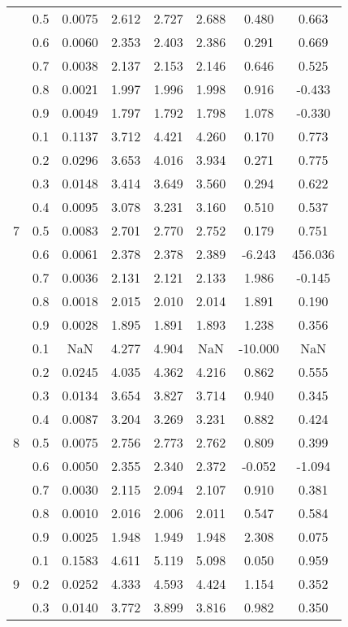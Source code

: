 \documentclass[11pt,a4paper]{report}
\begin{document}
\begin{longtable}{ | c | c || c | c | c | c | c | c | }
 & 0.5 & 0.0075 & 2.612 & 2.727 & 2.688 & 0.480 & 0.663 \\
 & 0.6 & 0.0060 & 2.353 & 2.403 & 2.386 & 0.291 & 0.669 \\
 & 0.7 & 0.0038 & 2.137 & 2.153 & 2.146 & 0.646 & 0.525 \\
 & 0.8 & 0.0021 & 1.997 & 1.996 & 1.998 & 0.916 & -0.433 \\
 & 0.9 & 0.0049 & 1.797 & 1.792 & 1.798 & 1.078 & -0.330 \\
 \hline
\multirow{9}{*}{7} & 0.1 & 0.1137 & 3.712 & 4.421 & 4.260 & 0.170 & 0.773 \\
 & 0.2 & 0.0296 & 3.653 & 4.016 & 3.934 & 0.271 & 0.775 \\
 & 0.3 & 0.0148 & 3.414 & 3.649 & 3.560 & 0.294 & 0.622 \\
 & 0.4 & 0.0095 & 3.078 & 3.231 & 3.160 & 0.510 & 0.537 \\
 & 0.5 & 0.0083 & 2.701 & 2.770 & 2.752 & 0.179 & 0.751 \\
 & 0.6 & 0.0061 & 2.378 & 2.378 & 2.389 & -6.243 & 456.036 \\
 & 0.7 & 0.0036 & 2.131 & 2.121 & 2.133 & 1.986 & -0.145 \\
 & 0.8 & 0.0018 & 2.015 & 2.010 & 2.014 & 1.891 & 0.190 \\
 & 0.9 & 0.0028 & 1.895 & 1.891 & 1.893 & 1.238 & 0.356 \\
 \hline
\multirow{9}{*}{8} & 0.1 & NaN & 4.277 & 4.904 & NaN & -10.000 & NaN \\
 & 0.2 & 0.0245 & 4.035 & 4.362 & 4.216 & 0.862 & 0.555 \\
 & 0.3 & 0.0134 & 3.654 & 3.827 & 3.714 & 0.940 & 0.345 \\
 & 0.4 & 0.0087 & 3.204 & 3.269 & 3.231 & 0.882 & 0.424 \\
 & 0.5 & 0.0075 & 2.756 & 2.773 & 2.762 & 0.809 & 0.399 \\
 & 0.6 & 0.0050 & 2.355 & 2.340 & 2.372 & -0.052 & -1.094 \\
 & 0.7 & 0.0030 & 2.115 & 2.094 & 2.107 & 0.910 & 0.381 \\
 & 0.8 & 0.0010 & 2.016 & 2.006 & 2.011 & 0.547 & 0.584 \\
 & 0.9 & 0.0025 & 1.948 & 1.949 & 1.948 & 2.308 & 0.075 \\
 \hline
\multirow{9}{*}{9} & 0.1 & 0.1583 & 4.611 & 5.119 & 5.098 & 0.050 & 0.959 \\
 & 0.2 & 0.0252 & 4.333 & 4.593 & 4.424 & 1.154 & 0.352 \\
 & 0.3 & 0.0140 & 3.772 & 3.899 & 3.816 & 0.982 & 0.350 \\

\end{longtable}
\end{document}
